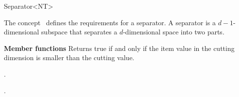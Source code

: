 

\begin{ccRefConcept}{Separator<NT>}


\ccDefinition
  
The concept \ccRefName\ defines the requirements for a separator.
A separator is a $d-1$-dimensional subspace that separates a $d$-dimensional space into two parts.

\ccCreation
{}  %


{\bf Member functions}
{Returns true if and only if the item value in the cutting dimension is smaller than the cutting value.}


\ccHasModels

.

\ccSeeAlso

.

\end{ccRefConcept}


